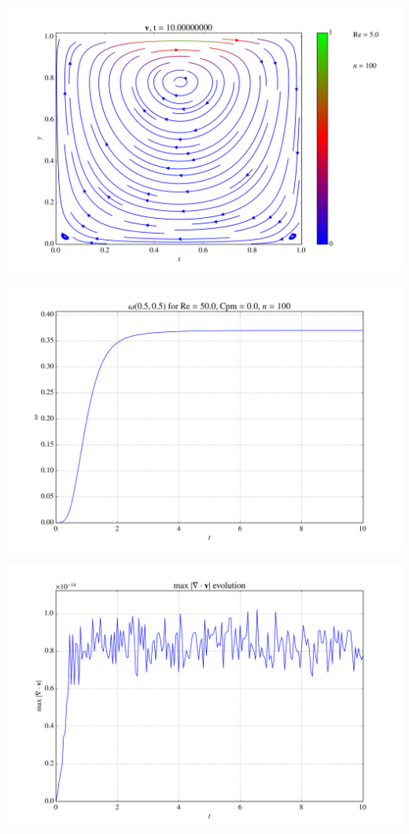 \documentclass[portrait,a0paper,fontscale=0.42]{baposter} %
\begin{document}
\begin{poster}
{\begin{multicols}{2}
\begin{center}
\includegraphics[width=0.8\linewidth]{simulations/Re5NoMagnetism.png}
\end{center}

\begin{center}
\includegraphics[width=0.8\linewidth]{simulations/vortRe50N100Chi01Cpm0T10fps20.png}
\end{center}

\begin{center}
\includegraphics[width=0.8\linewidth]{simulations/divVRe50N100Chi05Cpm5T10fps20.png}
\end{center}


\end{multicols}}
\end{poster}
\end{document}
